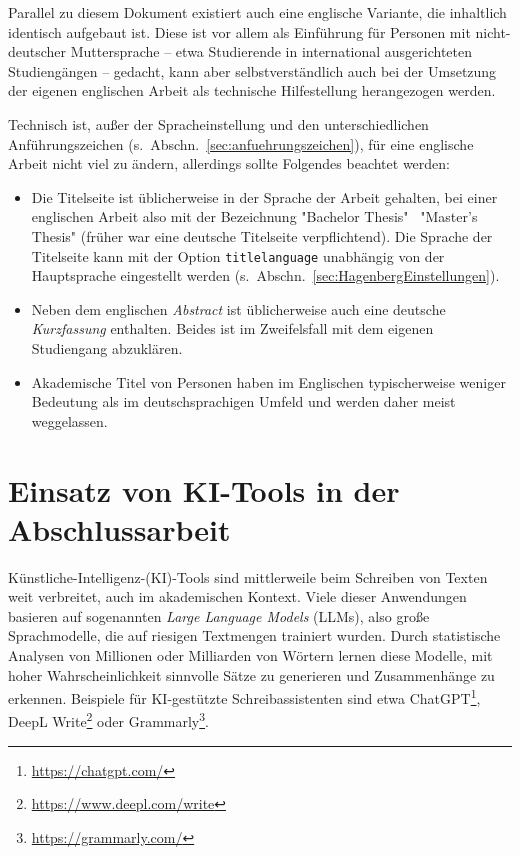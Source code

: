 Parallel zu diesem Dokument existiert auch eine englische Variante, die
inhaltlich identisch aufgebaut ist. Diese ist vor allem als Einführung für
Personen mit nicht-deutscher Muttersprache -- etwa Studierende in
international ausgerichteten Studiengängen -- gedacht, kann aber
selbstverständlich auch bei der Umsetzung der eigenen englischen Arbeit als
technische Hilfestellung herangezogen werden.

Technisch ist, außer der Spracheinstellung und den unterschiedlichen
Anführungszeichen (s.\ Abschn.~\ref{sec:anfuehrungszeichen}), für eine
englische Arbeit nicht viel zu ändern, allerdings sollte Folgendes beachtet
werden:
%
\begin{itemize}
    \item Die Titelseite ist üblicherweise in der Sprache der Arbeit gehalten,
    bei einer englischen Arbeit also mit der Bezeichnung "Bachelor Thesis"
    \bzw\ "Master's Thesis" (früher war eine deutsche Titelseite
    verpflichtend). Die Sprache der Titelseite kann mit der Option
    \texttt{titlelanguage} unabhängig von der Hauptsprache eingestellt werden
    (s.\ Abschn.~\ref{sec:HagenbergEinstellungen}).
    \item Neben dem englischen \emph{Abstract} ist üblicherweise auch eine
    deutsche \emph{Kurzfassung} enthalten. Beides ist im Zweifelsfall mit dem
    eigenen Studiengang abzuklären.
    \item Akademische Titel von Personen haben im Englischen typischerweise
    weniger Bedeutung als im deutschsprachigen Umfeld und werden daher meist
    weggelassen.
\end{itemize}


\section{Einsatz von KI-Tools in der Abschlussarbeit}

Künstliche-Intelligenz-(KI)-Tools sind mittlerweile beim Schreiben von Texten
weit verbreitet, auch im akademischen Kontext. Viele dieser Anwendungen
basieren auf sogenannten \emph{Large Language Models} (LLMs), also große
Sprachmodelle, die auf riesigen Textmengen trainiert wurden. Durch statistische
Analysen von Millionen oder Milliarden von Wörtern lernen diese Modelle, mit
hoher Wahrscheinlichkeit sinnvolle Sätze zu generieren und Zusammenhänge zu
erkennen. Beispiele für KI-gestützte Schreibassistenten sind etwa
ChatGPT\footnote{\url{https://chatgpt.com/}}, 
DeepL Write\footnote{\url{https://www.deepl.com/write}} oder 
Grammarly\footnote{\url{https://grammarly.com/}}.

